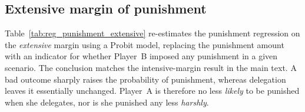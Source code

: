 

\subsection{Extensive margin of punishment} \label{appendix:reg_punishment_extensive}

Table~\ref{tab:reg_punishment_extensive} re-estimates the punishment regression on the \textit{extensive} margin using a Probit model, replacing the punishment amount with an indicator for whether Player~B imposed any punishment in a given scenario. The conclusion matches the intensive-margin result in the main text. A bad outcome sharply raises the probability of punishment, whereas delegation leaves it essentially unchanged. Player~A is therefore no less \textit{likely} to be punished when she delegates, nor is she punished any less \textit{harshly}.






